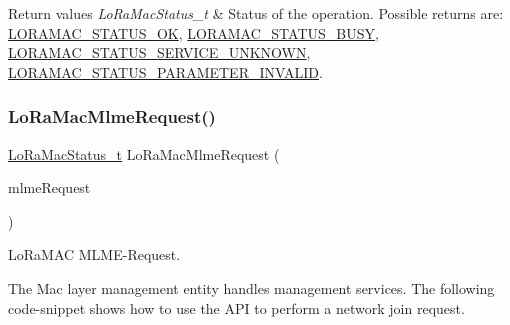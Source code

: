 \begin{DoxyRetVals}{Return values}
{\em Lo\+Ra\+Mac\+Status\+\_\+t} & Status of the operation. Possible returns are\+: \hyperlink{group__LORAMAC_gga1d18f26b344040b3ec5c3db662919661a03db5fca052313edb3823c014b653a74}{L\+O\+R\+A\+M\+A\+C\+\_\+\+S\+T\+A\+T\+U\+S\+\_\+\+OK}, \hyperlink{group__LORAMAC_gga1d18f26b344040b3ec5c3db662919661a66b12f569207eacd97ee1c1d6c4cee6d}{L\+O\+R\+A\+M\+A\+C\+\_\+\+S\+T\+A\+T\+U\+S\+\_\+\+B\+U\+SY}, \hyperlink{group__LORAMAC_gga1d18f26b344040b3ec5c3db662919661aff502a87db22d6a9a4919e4b54c7c1cf}{L\+O\+R\+A\+M\+A\+C\+\_\+\+S\+T\+A\+T\+U\+S\+\_\+\+S\+E\+R\+V\+I\+C\+E\+\_\+\+U\+N\+K\+N\+O\+WN}, \hyperlink{group__LORAMAC_gga1d18f26b344040b3ec5c3db662919661ad0d3119f247d00e1787dda106fcb3017}{L\+O\+R\+A\+M\+A\+C\+\_\+\+S\+T\+A\+T\+U\+S\+\_\+\+P\+A\+R\+A\+M\+E\+T\+E\+R\+\_\+\+I\+N\+V\+A\+L\+ID}. \\
\hline
\end{DoxyRetVals}
\mbox{\label{group__LORAMAC_ga097113f30feecc17c780940ff74af33e}} 
\subsubsection{\texorpdfstring{Lo\+Ra\+Mac\+Mlme\+Request()}{LoRaMacMlmeRequest()}}
{\footnotesize\ttfamily \hyperlink{group__LORAMAC_ga30bd25657e10480f8605ee951b0ecfbd}{Lo\+Ra\+Mac\+Status\+\_\+t} Lo\+Ra\+Mac\+Mlme\+Request (\begin{DoxyParamCaption}\item[{\hyperlink{group__LORAMAC_ga5a32f5920a7a3d04435c142be7f38b19}{Mlme\+Req\+\_\+t} $\ast$}]{mlme\+Request }\end{DoxyParamCaption})}



Lo\+Ra\+M\+AC M\+L\+M\+E-\/\+Request. 

The Mac layer management entity handles management services. The following code-\/snippet shows how to use the A\+PI to perform a network join request.


